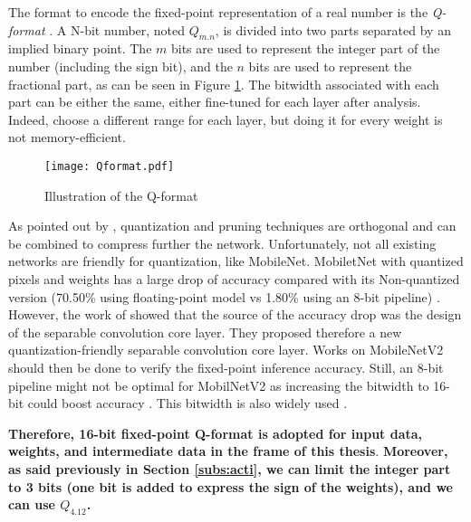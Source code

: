 The format to encode the fixed-point representation of a real number is the \textit{Q-format} \cite{ward_real-time_2001}. A N-bit number, noted $Q_{m.n}$, is divided into two parts separated by an implied binary point. The $m$ bits are used to represent the integer part of the number (including the sign bit), and the $n$ bits are used to represent the fractional part, as can be seen in Figure \ref{fig:Qformat}. The bitwidth associated with each part can be either the same, either fine-tuned for each layer after analysis. Indeed, \textcite{qiu_going_2016, yin_high_2018} choose a different range for each layer, but doing it for every weight is not memory-efficient.
%
\begin{figure}[H]
    \centering
    \texttt{[image: Qformat.pdf]}
    \caption{Illustration of the Q-format}
    \label{fig:Qformat}
\end{figure}

As pointed out by \textcite{han_deep_2016}, quantization and pruning techniques are orthogonal and can be combined to compress further the network. Unfortunately, not all existing networks are friendly for quantization, like MobileNet. MobiletNet with quantized pixels and weights has a large drop of accuracy compared with its Non-quantized version (70.50\% using floating-point model vs 1.80\% using an 8-bit pipeline) \cite{sheng_quantization-friendly_2018}. However, the work of \textcite{sheng_quantization-friendly_2018} showed that the source of the accuracy drop was the design of the separable convolution core layer. They proposed therefore a new quantization-friendly separable convolution core layer. Works on MobileNetV2 should then be done to verify the fixed-point inference accuracy. Still, an 8-bit pipeline might not be optimal for MobilNetV2 as increasing the bitwidth to 16-bit could boost accuracy \cite{cheng_recent_2018}. This bitwidth is also widely used \cite{huimin_li_high_2016, bai_cnn_2018}. 

\textbf{Therefore, 16-bit fixed-point Q-format is adopted for input data, weights, and intermediate data in the frame of this thesis}. \textbf{Moreover, as said previously in Section \ref{subs:acti}, we can limit the integer part to 3 bits (one bit is added to express the sign of the weights), and we can use $Q_{4.12}$.}
